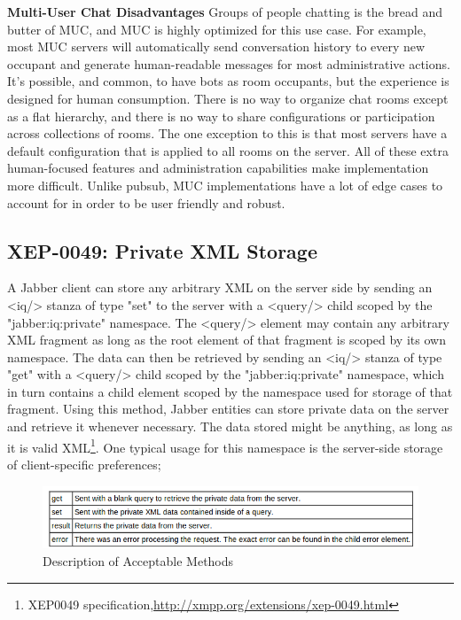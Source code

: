 	\textbf{Multi-User Chat Disadvantages}
	\newline
	Groups of people chatting is the bread and butter of MUC, and MUC is highly optimized for this use case. For example, most MUC servers will automatically send conversation history to every new occupant and generate human-readable messages for most administrative actions. It's possible, and common, to have bots as room occupants, but the experience is designed for human consumption. There is no way to organize chat rooms except as a flat hierarchy, and there is no way to share configurations or participation across collections of rooms. The one exception to this is that most servers have a default configuration that is applied to all rooms on the server. All of these extra human-focused features and administration capabilities make implementation more difficult. Unlike pubsub, MUC implementations have a lot of edge cases to account for in order to be user friendly and robust.


\subsection{XEP-0049: Private XML Storage}
	A Jabber client can store any arbitrary XML on the server side by sending an <iq/> stanza of type "set" to the server with a <query/> child scoped by the "jabber:iq:private" namespace. The <query/> element may contain any arbitrary XML fragment as long as the root element of that fragment is scoped by its own namespace. The data can then be retrieved by sending an <iq/> stanza of type "get" with a <query/> child scoped by the "jabber:iq:private" namespace, which in turn contains a child element scoped by the namespace used for storage of that fragment. Using this method, Jabber entities can store private data on the server and retrieve it whenever necessary. The data stored might be anything, as long as it is valid XML\footnote{XEP0049 specification,\url{http://xmpp.org/extensions/xep-0049.html}}. One typical usage for this namespace is the server-side storage of client-specific preferences; 
	
	\begin{figure}[!ht]
		\centering
		\includegraphics[scale=0.9]{images/xep0049Queries.png}   
		\caption[ Description of Acceptable Methods]{Description of Acceptable Methods}   
		\end{figure}
